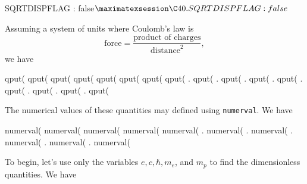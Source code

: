 \beginmaximasession
SQRTDISPFLAG : false$
\maximatexsession
\C40.  SQRTDISPFLAG : false$ \\
\endmaximasession

\noindent  Assuming a system of units where Coulomb's law is
\[
  \mbox{force} = \frac{\mbox{product of charges}}{\mbox{distance}^2},
\]
we have

\beginmaximasession
qput(%
qput(%
qput(%
qput(%
qput(%
qput(%
qput(%
qput(%
\maximatexsession
{}.  qput(%
.  qput(%
.  qput(%
.  qput(%
.  qput(%
.  qput(%
.  qput(%
.  qput(%
\endmaximasession

\noindent  The numerical values of these quantities may 
defined using {\tt numerval}.  We have

\beginmaximasession
numerval(%
numerval(%
numerval(%
numerval(%
numerval(%
\maximatexsession
{}.  numerval(%
.  numerval(%
.  numerval(%
.  numerval(%
.  numerval(%
\endmaximasession


\noindent To begin, let's use only the variables $e, c, \hbar, m_e$, and
$m_p$ to find the dimensionless quantities.  We have


